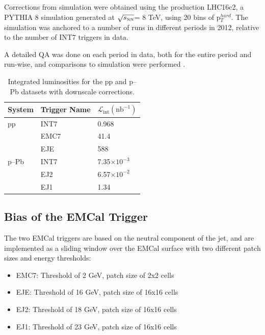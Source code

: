 \documentclass[ALICE]{ALICE_analysis_notes}
\newcommand{\sNN}{$\sqrt{s_{\mbox{\tiny NN}}}$\xspace}
\newcommand{\pPb}{{\mbox{p--Pb}}\xspace}
\newcommand{\pp}{pp\xspace}
\begin{document}
Corrections from simulation were obtained using the production LHC16c2, a PYTHIA 8 simulation generated at \sNN = 8 TeV, using 20 bins of p$_T^{hard}$. The simulation was anchored to a number of runs in different periods in 2012, relative to the number of INT7 triggers in data.

A detailed QA was done on each period in data, both for the entire period and run-wise, and comparisons to simulation were performed \cite{JIRATicket}.

\begin{table}[hbt!]
    \centering
    \caption{Integrated luminosities for the \pp and \pPb datasets with downscale corrections.}
    \begin{tabular}{  m{2.4cm}  m{3cm} m{3cm}  }
        \hline
        System & Trigger Name & $\mathscr{L}_{\text{int}}  (\text{nb}^{-1})$ \\
        \hline
        \pp & INT7 & 0.968 \\
            & EMC7 & 41.4 \\
            & EJE & 588 \\ 
        \hline
        \pPb & INT7 & 7.35$\times 10^{-3}$ \\
             & EJ2 & 6.57$\times 10^{-2}$ \\
             & EJ1 & 1.34 \\ 
        \hline
    \end{tabular}
    \label{table:dataset_lumi}
  \end{table}

\subsection{Bias of the EMCal Trigger}
\label{sec:EMCTriggerBias}

The two EMCal triggers are based on the neutral component of the jet, and are implemented as a sliding window over the EMCal surface with two different patch sizes and energy thresholds:

\begin{itemize}
    \item EMC7: Threshold of 2 GeV, patch size of 2x2 cells
    \item EJE: Threshold of 16 GeV, patch size of 16x16 cells
    \item EJ2: Threshold of 18 GeV, patch size of 16x16 cells
    \item EJ1: Threshold of 23 GeV, patch size of 16x16 cells
\end{itemize}
\end{document}
